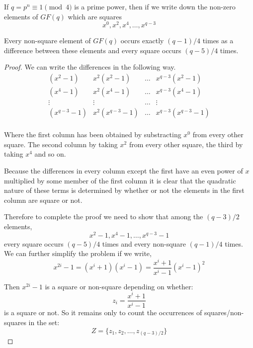 \begin{lemma}
If $q = p^n \equiv 1\pmod 4$ is a prime power, then if we write down the non-zero elements of $GF(q)$ which are squares
\begin{equation}
 x^0, x^2, x^4, \ldots, x^{q - 3}
\end{equation}

Every non-square element of $GF(q)$ occurs exactly $(q - 1)/4$ times as a difference between these elements and every square occurs $(q - 5)/4$ times.
\end{lemma}

\begin{proof}
We can write the differences in the following way.
\begin{equation}
\begin{array}{cccc}
     (x^2-1)   &  x^{2}(x^{2}-1)  & \ldots  & x^{q-3}(x^{2}-1)   \\
     (x^4-1)   &  x^{2}(x^{4}-1)  & \ldots  & x^{q-3}(x^{4}-1)   \\
      \vdots   &     \vdots       & \ldots  &      \vdots        \\
   (x^{q-3}-1) & x^{2}(x^{q-3}-1) & \ldots  & x^{q-3}(x^{q-3}-1) \\
\end{array}
\end{equation}

Where the first column has been obtained by substracting $x^0$ from every other square.
The second column by taking $x^2$ from every other square, the third by taking $x^4$ and so on.

Because the differences in every column except the first have an even power of $x$ multiplied by some member of the first column it is clear that the quadratic nature of these terms is determined by whether or not the elements in the first column are square or not.

Therefore to complete the proof we need to show that among the $(q - 3)/2$ elements,
\begin{equation}
  x^2 - 1, x^4 - 1, \ldots, x^{q - 3} - 1
\end{equation}
every square occurs $(q - 5)/4$ times and every non-square $(q - 1)/4$ times.
We can further simplify the problem if we write,
\begin{equation}
x^{2i} - 1 = (x^i + 1)(x^i - 1) = \frac{x^i + 1}{x^i - 1}(x^i - 1)^2
\end{equation}

Then $x^{2i}-1$ is a square or non-square depending on whether:
\begin{equation}
  z_i = \frac{x^i + 1}{x^i - 1}
\end{equation}
is a square or not.
So it remains only to count the occurrences of squares/non-squares in the set:
\begin{equation}
  Z = \{z_1, z_2, \ldots, z_{(q - 3)/2}\}
\end{equation}


\end{proof}
